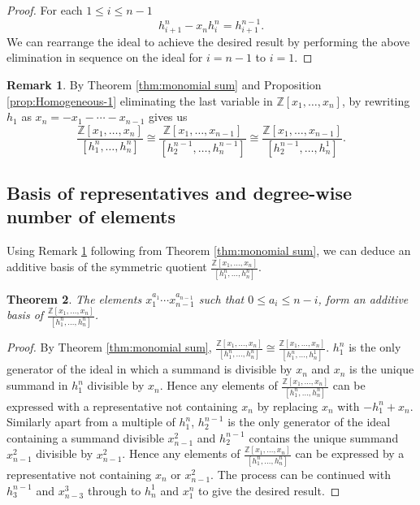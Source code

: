 \documentclass{article}
\theoremstyle{plain}
\newtheorem{thm}{Theorem}[section]
\theoremstyle{definition}
\newtheorem{rmk}[thm]{Remark}
\numberwithin{thm}{section}
\begin{document}
			\begin{proof}
				For each $1\leq i\leq n-1$
				\begin{equation*}
					h^n_{i+1}-x_n h^n_i=h^{n-1}_{i+1}.
				\end{equation*}
				We can rearrange the ideal to achieve the desired result by performing the above elimination in sequence on the ideal for $i={n-1}$ to $i=1$.
			\end{proof}
			
			\begin{rmk}\label{remk:SymQotForms}
				By Theorem \ref{thm:monomial sum} and Proposition \ref{prop:Homogeneous-1} eliminating the last variable in $\mathbb{Z}[x_1,\dots,x_n]$,
				by rewriting $h_1$ as $x_n=-x_1-\cdots-x_{n-1}$ gives us
				\begin{equation*}
					\frac{\mathbb{Z}[x_1,\dots,x_n]}{[h_1^n,\dots,h_n^n]}
					\cong\frac{\mathbb{Z}[x_1,\dots,x_{n-1}]}{[h_2^{n-1},\dots,h_n^{n-1}]}
					\cong\frac{\mathbb{Z}[x_1,\dots,x_{n-1}]}{[h_2^{n-1},\dots,h_n^{1}]}.
				\end{equation*}
			\end{rmk}
			
			
			
		\subsection{Basis of representatives and degree-wise number of elements}\label{subsec:BettiNum}
		
			Using Remark \ref{remk:SymQotForms} following from Theorem \ref{thm:monomial sum}, we can deduce an additive basis of the symmetric quotient
			$\frac{\mathbb{Z}[x_1,\dots,x_n]}{[h_1^n,\dots,h_n^n]}$.
			
			\begin{thm}\label{thm:AddBasis}
				The elements $x_1^{a_1}\cdots x_{n-1}^{a_{n-1}}$ such that $0\leq a_i \leq n-i$, form an additive basis of
				$\frac{\mathbb{Z}[x_1,\dots,x_n]}{[h_1^n,\dots,h_n^n]}$.
			\end{thm}
			
			\begin{proof}
				By Theorem \ref{thm:monomial sum}, $\frac{\mathbb{Z}[x_1,\dots,x_n]}{[h_1^n,\dots,h_n^n]}\cong\frac{\mathbb{Z}[x_1,\dots,x_n]}{[h_1^n,\dots,h_n^1]}$.
				$h_1^n$ is the only generator of the ideal in which a summand is divisible by $x_n$ and $x_n$ is the unique summand in $h_1^n$ divisible by $x_n$.
				Hence any elements of $\frac{\mathbb{Z}[x_1,\dots,x_n]}{[h_1^n,\dots,h_n^n]}$ can be expressed with a representative not containing $x_n$
				by replacing $x_n$ with $-h_1^n+x_n$.
				Similarly apart from a multiple of $h_1^n$, $h_2^{n-1}$ is the only generator of the ideal containing a summand divisible $x_{n-1}^2$
				and $h_2^{n-1}$ contains the unique summand $x_{n-1}^2$ divisible by $x^2_{n-1}$.
				Hence any elements of $\frac{\mathbb{Z}[x_1,\dots,x_n]}{[h_1^n,\dots,h_n^n]}$ can be expressed by a representative not containing $x_{n}$ or $x_{n-1}^2$.
				The process can be continued with $h_3^{n-1}$ and $x_{n-3}^3$ through to $h_n^1$ and $x_1^n$ to give the desired result. 
			\end{proof}
			
\end{document}
